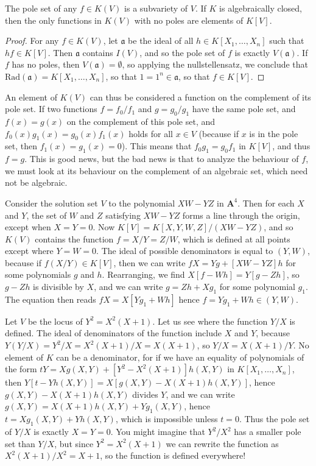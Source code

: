 \begin{prop}
    The pole set of any $f \in K(V)$ is a subvariety of $V$. If $K$ is algebraically closed, then the only functions in $K(V)$ with no poles are elements of $K[V]$.
\end{prop}
\begin{proof}
    For any $f \in K(V)$, let $\mathfrak{a}$ be the ideal of all $h \in K[X_1, \dots, X_n]$ such that $hf \in K[V]$. Then $\mathfrak{a}$ contains $I(V)$, and so the pole set of $f$ is exactly $V(\mathfrak{a})$. If $f$ has no poles, then $V(\mathfrak{a}) = \emptyset$, so applying the nullstellensatz, we conclude that $\text{Rad}(\mathfrak{a}) = K[X_1, \dots, X_n]$, so that $1 = 1^n \in \mathfrak{a}$, so that $f \in K[V]$.
\end{proof}

An element of $K(V)$ can thus be considered a function on the complement of its pole set. If two functions $f = f_0/f_1$ and $g = g_0/g_1$ have the same pole set, and $f(x) = g(x)$ on the complement of this pole set, and $f_0(x) g_1(x) = g_0(x)f_1(x)$ holds for all $x \in V$ (because if $x$ is in the pole set, then $f_1(x) = g_1(x) = 0$). This means that $f_0g_1 = g_0f_1$ in $K[V]$, and thus $f = g$. This is good news, but the bad news is that to analyze the behaviour of $f$, we must look at its behaviour on the complement of an algebraic set, which need not be algebraic.

\begin{example}
    Consider the solution set $V$ to the polynomial $XW - YZ$ in $\mathbf{A}^4$. Then for each $X$ and $Y$, the set of $W$ and $Z$ satisfying $XW - YZ$ forms a line through the origin, except when $X = Y = 0$. Now $K[V] = K[X,Y,W,Z]/(XW - YZ)$, and so $K(V)$ contains the function $f = X/Y = Z/W$, which is defined at all points except where $Y = W = 0$. The ideal of possible denominators is equal to $(Y,W)$, because if $f(X/Y) \in K[V]$, then we can write $fX = Yg + [XW - YZ]h$ for some polynomials $g$ and $h$. Rearranging, we find $X[f-Wh] = Y[g-Zh]$, so $g - Zh$ is divisible by $X$, and we can write $g = Zh + Xg_1$ for some polynomial $g_1$. The equation then reads $fX = X[Yg_1 + Wh]$ hence $f = Yg_1 + Wh \in (Y,W)$.
\end{example}

\begin{example}
    Let $V$ be the locus of $Y^2 = X^2(X+1)$. Let us see where the function $Y/X$ is defined. The ideal of denominators of the function include $X$ and $Y$, because $Y(Y/X) = Y^2/X = X^2(X+1)/X = X(X+1)$, so $Y/X = X(X+1)/Y$. No element of $K$ can be a denominator, for if we have an equality of polynomials of the form $tY = Xg(X,Y) + [Y^2 - X^2(X+1)]h(X,Y)$ in $K[X_1, \dots, X_n]$, then $Y[t - Yh(X,Y)] = X[g(X,Y) - X(X+1)h(X,Y)]$, hence $g(X,Y) - X(X+1)h(X,Y)$ divides $Y$, and we can write $g(X,Y) = X(X+1)h(X,Y) + Yg_1(X,Y)$, hence $t = Xg_1(X,Y) + Yh(X,Y)$, which is impossible unless $t = 0$. Thus the pole set of $Y/X$ is exactly $X = Y = 0$. You might imagine that $Y^2/X^2$ has a smaller pole set than $Y/X$, but since $Y^2 = X^2(X+1)$ we can rewrite the function as $X^2(X+1)/X^2 = X+1$, so the function is defined everywhere!
\end{example}

